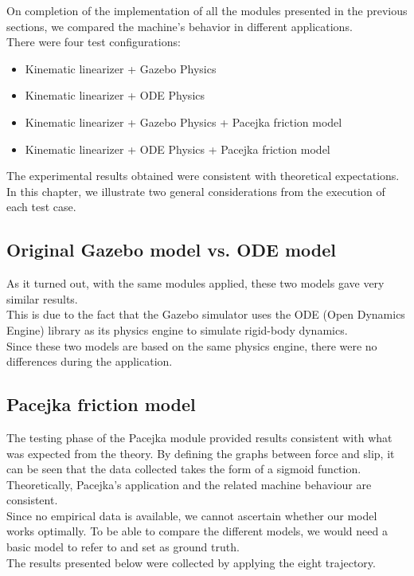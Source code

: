 On completion of the implementation of all the modules presented in the previous sections, we compared the machine's behavior in different applications.\\
There were four test configurations:
\begin{itemize}
	\item Kinematic linearizer + Gazebo Physics
	\item Kinematic linearizer + ODE Physics
	\item Kinematic linearizer + Gazebo Physics + Pacejka friction model 
	\item Kinematic linearizer + ODE Physics + Pacejka friction model
\end{itemize}
The experimental results obtained were consistent with theoretical expectations. \\
In this chapter, we illustrate two general considerations from the execution of each test case.

\subsection{Original Gazebo model vs. ODE model}
As it turned out, with the same modules applied, these two models gave very similar results.\\
This is due to the fact that the Gazebo simulator uses the ODE (Open Dynamics Engine) library as its physics engine to simulate rigid-body dynamics.\\
Since these two models are based on the same physics engine, there were no differences during the application.


\subsection{Pacejka friction model}
The testing phase of the Pacejka module provided results consistent with what was expected from the theory. By defining the graphs between force and slip, it can be seen that the data collected takes the form of a sigmoid function.\\
Theoretically, Pacejka's application and the related machine behaviour are consistent. \\
Since no empirical data is available, we cannot ascertain whether our model works optimally. To be able to compare the different models, we would need a basic model to refer to and set as ground truth.\\
The results presented below were collected by applying the eight trajectory.

